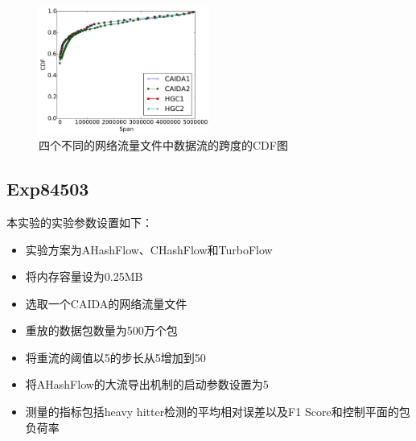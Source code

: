 \documentclass{article}
\begin{document}
\begin{figure}[ht!]
	\centering
	\includegraphics[width=0.5\textwidth]{figures/exp84502/cdf}
	\caption{四个不同的网络流量文件中数据流的跨度的CDF图}
	\label{fig:flow_span}
\end{figure}

\subsection{Exp84503}
本实验的实验参数设置如下：
\begin{itemize}
	\item 实验方案为AHashFlow、CHashFlow和TurboFlow
	\item 将内存容量设为0.25MB
	\item 选取一个CAIDA的网络流量文件
	\item 重放的数据包数量为500万个包
	\item 将重流的阈值以5的步长从5增加到50
	\item 将AHashFlow的大流导出机制的启动参数设置为5
	\item 测量的指标包括heavy hitter检测的平均相对误差以及F1 Score和控制平面的包负荷率
\end{itemize}
\end{document}
